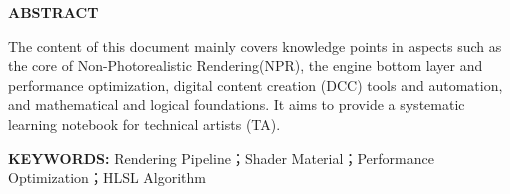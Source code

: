 \documentclass[twoside, 11pt, a4paper]{article}
\newcommand{\sihao}{\zihao{4}}
\newcommand{\xiaosi}{\zihao{-4}}
\newcommand{\wuhao}{\zihao{5}}
\newcommand{\headerfont}{\wuhao\kaishu} %
\numberwithin{equation}{section} %
\begin{document}

\cleardoublepage %

\begin{center}
    {\sihao\bfseries ABSTRACT} 
\end{center}



\vspace{1em} %

{%
\xiaosi The content of this document mainly covers knowledge points in aspects such as the core of Non-Photorealistic Rendering(NPR), the engine bottom layer and performance optimization, digital content creation (DCC) tools and automation, and mathematical and logical foundations. It aims to provide a systematic learning notebook for technical artists (TA).
}

\vspace{1em} %

\noindent 
{\xiaosi\bfseries KEYWORDS:} 
{\xiaosi Rendering Pipeline；Shader Material；Performance Optimization；HLSL Algorithm}

\cleardoublepage
\pagestyle{fancy}                %


\fancyhead[EC]{\headerfont 目\quad 录} 


\tableofcontents

\cleardoublepage
\fancyhead[EC]{\headerfont \leftmark}

\end{document}
